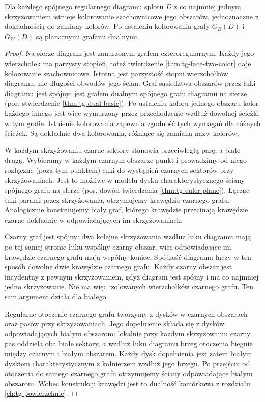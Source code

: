 \begin{stwierdzenie}
Dla każdego spójnego regularnego diagramu splotu $D$
z co najmniej jednym skrzyżowaniem istnieje kolorowanie
szachownicowe jego obszarów, jednoznaczne z dokładnością
do zamiany kolorów. Po ustaleniu kolorowania
grafy $G_B(D)$ i $G_W(D)$ są planarnymi grafami dualnymi.
\end{stwierdzenie}
\begin{proof}
Na sferze diagram jest zanurzonym grafem czteroregularnym.
Każdy jego wierzchołek ma parzysty stopień, toteż
twierdzenie \ref{thm:tg-face-two-color} daje kolorowanie
szachownicowe. Istotna jest parzystość stopni
wierzchołków diagramu, nie długości obwodów jego ścian.
Graf sąsiedztwa obszarów przez łuki diagramu jest spójny:
jest grafem dualnym spójnego grafu diagramu na sferze
(por. stwierdzenie \ref{thm:tg-dual-basic}).
Po ustaleniu koloru jednego obszaru kolor każdego
innego jest więc wymuszony przez przechodzenie wzdłuż
dowolnej ścieżki w tym grafie. Istnienie kolorowania
zapewnia zgodność tych wymagań dla różnych ścieżek.
Są dokładnie dwa kolorowania, różniące się zamianą
nazw kolorów.

W każdym skrzyżowaniu czarne sektory stanowią przeciwległą
parę, a białe drugą. Wybieramy w każdym czarnym obszarze
punkt i prowadzimy od niego rozłączne (poza tym punktem)
łuki do wystąpień czarnych sektorów przy skrzyżowaniach.
Jest to możliwe w modelu dysku charakterystycznego ściany
spójnego grafu na sferze (por. dowód twierdzenia
\ref{thm:tg-euler-plane}). Łącząc łuki parami przez
skrzyżowania, otrzymujemy krawędzie czarnego grafu.
Analogicznie konstruujemy biały graf, którego krawędzie
przecinają krawędzie czarne dokładnie w odpowiadających
im skrzyżowaniach.

Czarny graf jest spójny: dwa kolejne skrzyżowania
wzdłuż łuku diagramu mają po tej samej stronie łuku
wspólny czarny obszar, więc odpowiadające im krawędzie
czarnego grafu mają wspólny koniec. Spójność diagramu
łączy w ten sposób dowolne dwie krawędzie czarnego
grafu. Każdy czarny obszar jest incydentny z pewnym
skrzyżowaniem, gdyż diagram jest spójny i ma co najmniej
jedno skrzyżowanie. Nie ma więc izolowanych wierzchołków
czarnego grafu. Ten sam argument działa dla białego.

Regularne otoczenie czarnego grafu tworzymy z dysków
w czarnych obszarach oraz pasów przy skrzyżowaniach.
Jego dopełnienie składa się z dysków odpowiadających
białym obszarom: lokalnie przy każdym skrzyżowaniu
czarny pas oddziela oba białe sektory, a wzdłuż łuku
diagramu brzeg otoczenia biegnie między czarnym i białym
obszarem. Każdy dysk dopełnienia jest zatem białym dyskiem
charakterystycznym z kołnierzem wzdłuż jego brzegu.
Po przejściu od otoczenia do samego czarnego grafu
otrzymujemy ściany odpowiadające białym obszarom.
Wobec konstrukcji krawędzi jest to dualność komórkowa
z rozdziału \ref{ch:tg-powierzchnie}.
\end{proof}

